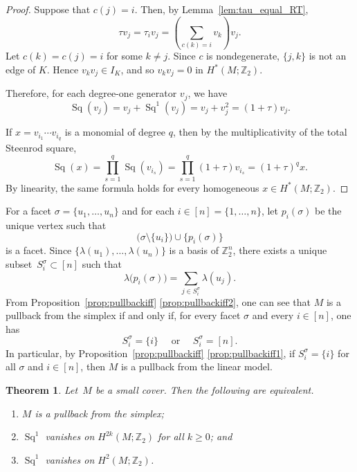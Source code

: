 \documentclass{amsart}
\newcommand{\Z}{\mathbb{Z}}
\DeclareMathOperator{\Sq}{Sq}
\theoremstyle{plain}
\newtheorem{theorem}{Theorem}[section]
\numberwithin{equation}{section}
\theoremstyle{definition}
\theoremstyle{remark}
\begin{document}
\begin{proof}
    Suppose that $c(j)=i$. 
    Then, by Lemma~\ref{lem:tau_equal_RT},
    $$
        \tau v_j= \tau_i v_j=\left(\sum_{c(k)=i} v_k\right)v_j.
    $$
    Let $c(k)=c(j)=i$ for some $k\neq j$.
    Since $c$ is nondegenerate, $\{j,k\}$ is not an edge of $K$. 
    Hence $v_kv_j\in I_K$, and so $v_kv_j=0$ in $H^\ast(M;\Z_2)$.
    
    Therefore, for each degree-one generator $v_j$, we have
    $$
        \Sq(v_j)=v_j+\Sq^1(v_j)=v_j+v_j^2 = (1+\tau)v_j.
    $$
    
    If $x=v_{i_1}\cdots v_{i_q}$ is a monomial of degree $q$, then by the multiplicativity of the total Steenrod square,
    $$
        \Sq(x)=\prod_{s=1}^q \Sq(v_{i_s}) =\prod_{s=1}^q (1+\tau)v_{i_s} =(1+\tau)^q x.
    $$
    By linearity, the same formula holds for every homogeneous $x\in H^\ast(M;\Z_2)$.
\end{proof}

For a facet $\sigma=\{u_1,\dots,u_n\}$ and for each $i \in [n] = \{1,\ldots,n\}$, let $p_i(\sigma)$ be the unique vertex such that
$$
    \bigl(\sigma\setminus\{u_i\}\bigr)\cup\{p_i(\sigma)\}
$$
is a facet. 
Since $\{\lambda(u_1),\dots,\lambda(u_n)\}$ is a basis of $\Z_2^n$,
there exists a unique subset~$S_i^\sigma \subset [n]$ such that
\[
\lambda\bigl(p_i(\sigma)\bigr)
= \sum_{j \in S_i^\sigma} \lambda(u_j).
\]
From Proposition~\ref{prop:pullbackiff} \eqref{prop:pullbackiff2}, one can see that $M$ is a pullback from the simplex if and only if, for every facet $\sigma$ and every $i\in[n]$, one has
$$
    S_i^\sigma=\{i\} \quad \text{ or } \quad S_i^\sigma=[n].
$$
In particular, by Proposition~\ref{prop:pullbackiff} \eqref{prop:pullbackiff1}, if $S_i^\sigma = \{i\}$ for all $\sigma$ and $i \in [n]$, then $M$ is a pullback from the linear model.

\begin{theorem}\label{thm:Sq1_H2_characterizes_simplex_pullback}
    Let~$M$ be a small cover.
    Then the following are equivalent.
    \begin{enumerate}
        \item\label{eq:FT1} $M$ is a pullback from the simplex;
        \item\label{eq:FT2} $\Sq^1$ vanishes on $H^{2k}(M;\Z_2)$ for all $k\geq 0$; and
        \item\label{eq:FT3} $\Sq^1$ vanishes on $H^2(M;\Z_2)$.
    \end{enumerate}
\end{theorem}
\end{document}
